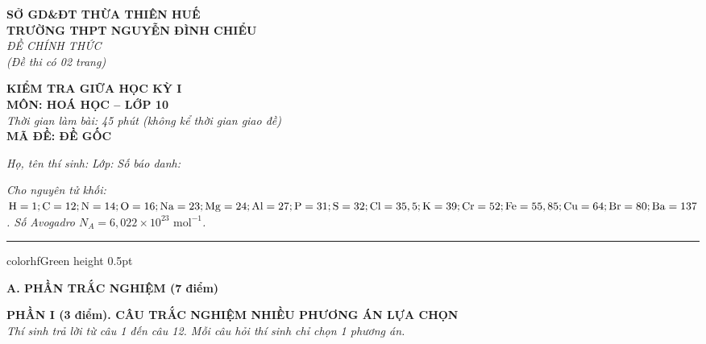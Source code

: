 \documentclass[11pt,a4paper]{article}
\begin{document}
\begin{minipage}[t]{0.48\textwidth}
\textbf{SỞ GD\&ĐT THỪA THIÊN HUẾ}\\
\textbf{TRƯỜNG THPT NGUYỄN ĐÌNH CHIỂU}\\
\textit{ĐỀ CHÍNH THỨC}\\
\textit{(Đề thi có 02 trang)}
\end{minipage}
\hfill
\begin{minipage}[t]{0.48\textwidth}
\raggedleft
\textbf{\color{hfRed}KIỂM TRA GIỮA HỌC KỲ I}\\
\textbf{MÔN: HOÁ HỌC -- LỚP 10}\\
\textit{Thời gian làm bài: 45 phút (không kể thời gian giao đề)}\\
\textbf{MÃ ĐỀ: ĐỀ GỐC}
\end{minipage}

\vspace{4pt}
\noindent
\textit{Họ, tên thí sinh:} \dotfill \textit{Lớp:} \dotfill \textit{Số báo danh:} \dotfill

\vspace{3pt}
\noindent
\textit{\footnotesize Cho nguyên tử khối: $\ce{H} = 1; \ce{C} = 12; \ce{N} = 14; \ce{O} = 16; \ce{Na} = 23; \ce{Mg} = 24; \ce{Al} = 27; \ce{P} = 31; \ce{S} = 32; \ce{Cl} = 35,5; \ce{K} = 39; \ce{Cr} = 52; \ce{Fe} = 55,85; \ce{Cu} = 64; \ce{Br} = 80; \ce{Ba} = 137$. Số Avogadro $N_A = 6,022 \times 10^{23}\text{ mol}^{-1}$.}

\vspace{3pt}
\hrule color{hfGreen} height 0.5pt

\vspace{4pt}
\noindent
{\color{mainGreen}\textbf{\Large A. PHẦN TRẮC NGHIỆM (7 điểm)}}

\vspace{3pt}
\noindent
{\color{mainGreen}\textbf{\large PHẦN I (3 điểm). CÂU TRẮC NGHIỆM NHIỀU PHƯƠNG ÁN LỰA CHỌN}}\\
\textit{\small Thí sinh trả lời từ câu 1 đến câu 12. Mỗi câu hỏi thí sinh chỉ chọn 1 phương án.}
\vspace{2pt}
\end{document}
